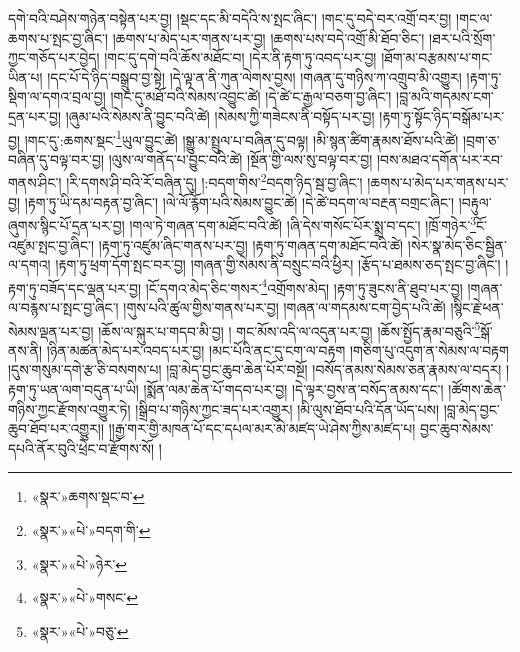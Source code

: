དགེ་བའི་བཤེས་གཉེན་བསྟེན་པར་བྱ། །སྡང་དང་མི་བདེའི་ས་སྤང་ཞིང་། །གང་དུ་བདེ་བར་འགྲོ་བར་བྱ། །གང་ལ་ཆགས་པ་སྤང་བྱ་ཞིང་། །ཆགས་པ་མེད་པར་གནས་པར་བྱ། །ཆགས་པས་བདེ་འགྲོ་མི་ཐོབ་ཅིང་། །ཐར་པའི་སྲོག་ཀྱང་གཅོད་པར་བྱེད། །གང་དུ་དགེ་བའི་ཆོས་མཐོང་བ། །དེར་ནི་རྟག་ཏུ་འབད་པར་བྱ། །ཐོག་མ་བརྩམས་པ་གང་ཡིན་པ། །དང་པོ་དེ་ཉིད་བསྒྲུབ་བྱ་སྟེ། །དེ་ལྟ་ན་ནི་ཀུན་ལེགས་བྱས། །གཞན་དུ་གཉིས་ཀ་འགྲུབ་མི་འགྱུར། །རྟག་ཏུ་སྡིག་ལ་དགའ་བྲལ་བྱ། །གང་དུ་མཐོ་བའི་སེམས་འབྱུང་ཚེ། །དེ་ཚེ་ང་རྒྱལ་བཅག་བྱ་ཞིང་། །བླ་མའི་གདམས་ངག་དྲན་པར་བྱ། །ཞུམ་པའི་སེམས་ནི་བྱུང་བའི་ཚེ། །སེམས་ཀྱི་གཟེངས་ནི་བསྟོད་པར་བྱ། །རྟག་ཏུ་སྟོང་ཉིད་བསྒོམ་པར་བྱ། །གང་དུ་:ཆགས་སྡང་\footnote{«སྣར་»ཆགས་སྡང་བ་}ཡུལ་བྱུང་ཚེ། །སྒྱུ་མ་སྤྲུལ་པ་བཞིན་དུ་བལྟ། །མི་སྙན་ཚིག་རྣམས་ཐོས་པའི་ཚེ། །བྲག་ཅ་བཞིན་དུ་བལྟ་བར་བྱ། །ལུས་ལ་གནོད་པ་བྱུང་བའི་ཚེ། །སྔོན་གྱི་ལས་སུ་བལྟ་བར་བྱ། །བས་མཐའ་དགོན་པར་རབ་གནས་ཤིང་། །རི་དགས་ཤི་བའི་རོ་བཞིན་དུ། །:བདག་གིས་\footnote{«སྣར་»«པེ་»བདག་གི་}བདག་ཉིད་སྦ་བྱ་ཞིང་། །ཆགས་པ་མེད་པར་གནས་པར་བྱ། །རྟག་ཏུ་ཡི་དམ་བརྟན་བྱ་ཞིང་། །ལེ་ལོ་རྙོག་པའི་སེམས་བྱུང་ཚེ། །དེ་ཚེ་བདག་ལ་བརྔན་བགྲང་ཞིང་། །བརྟུལ་ཞུགས་སྙིང་པོ་དྲན་པར་བྱ། །གལ་ཏེ་གཞན་དག་མཐོང་བའི་ཚེ། །ཞི་དེས་གསོང་པོར་སྨྲ་བ་དང་། །ཁྲོ་གཉེར་\footnote{«སྣར་»«པེ་»ཉེར་}ངོ་འཛུམ་སྤང་བྱ་ཞིང་། །རྟག་ཏུ་འཛུམ་ཞིང་གནས་པར་བྱ། །རྟག་ཏུ་གཞན་དག་མཐོང་བའི་ཚེ། །སེར་སྣ་མེད་ཅིང་སྦྱིན་ལ་དགའ། །རྟག་ཏུ་ཕྲག་དོག་སྤང་བར་བྱ། །གཞན་གྱི་སེམས་ནི་བསྲུང་བའི་ཕྱིར། །རྩོད་པ་ཐམས་ཅད་སྤང་བྱ་ཞིང་། །རྟག་ཏུ་བཟོད་དང་ལྡན་པར་བྱ། །ངོ་དགའ་མེད་ཅིང་གསར་\footnote{«སྣར་»«པེ་»གསང་}འགྲོགས་མེད། །རྟག་ཏུ་ཟུངས་ནི་ཐུབ་པར་བྱ། །གཞན་ལ་བརྙས་པ་སྤང་བྱ་ཞིང་། །གུས་པའི་ཚུལ་གྱིས་གནས་པར་བྱ། །གཞན་ལ་གདམས་ངག་བྱེད་པའི་ཚེ། །སྙིང་རྗེ་ཕན་སེམས་ལྡན་པར་བྱ། །ཆོས་ལ་སྐུར་པ་གདབ་མི་བྱ། །
གང་མོས་འདི་ལ་འདུན་པར་བྱ། །ཆོས་སྤྱོད་རྣམ་བཅུའི་\footnote{«སྣར་»«པེ་»བཅུ་}སྒོ་ནས་ནི། །ཉིན་མཚན་མེད་པར་འབད་པར་བྱ། །མང་པོའི་ནང་དུ་ངག་ལ་བརྟག །གཅིག་པུ་འདུག་ན་སེམས་ལ་བརྟག །དུས་གསུམ་དགེ་རྩ་ཅི་བསགས་པ། །བླ་མེད་བྱང་ཆུབ་ཆེན་པོར་བསྔོ། །བསོད་ནམས་སེམས་ཅན་རྣམས་ལ་བདར། །རྟག་ཏུ་ཡན་ལག་བདུན་པ་ཡི། །སྨོན་ལམ་ཆེན་པོ་གདབ་པར་བྱ། །དེ་ལྟར་བྱས་ན་བསོད་ནམས་དང་། །ཚོགས་ཆེན་གཉིས་ཀྱང་རྫོགས་འགྱུར་ཏེ། །སྒྲིབ་པ་གཉིས་ཀྱང་ཟད་པར་འགྱུར། །མི་ལུས་ཐོབ་པའི་དོན་ཡོད་པས། །བླ་མེད་བྱང་ཆུབ་ཐོབ་པར་འགྱུར།། །།རྒྱ་གར་གྱི་མཁན་པོ་དང་དཔལ་མར་མེ་མཛད་ཡེ་ཤེས་ཀྱིས་མཛད་པ། བྱང་ཆུབ་སེམས་དཔའི་ནོར་བུའི་ཕྲེང་བ་རྫོགས་སོ། ། 